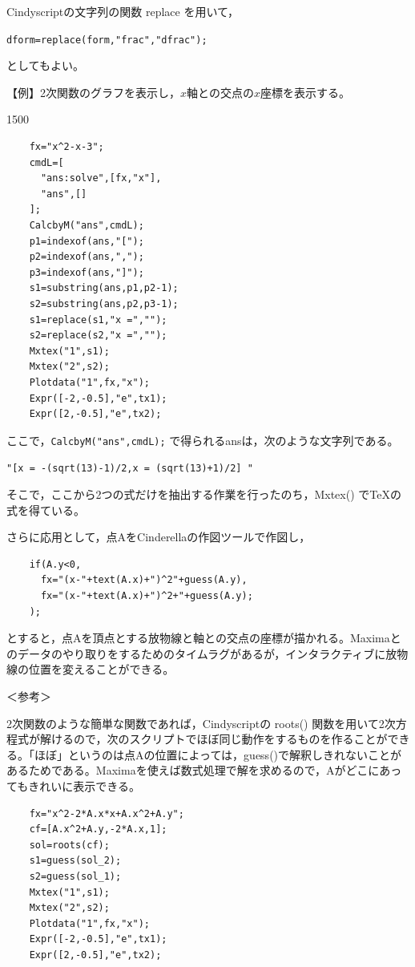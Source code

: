 \documentclass[papersize,a4paper,12pt,uplatex]{jsarticle}
\begin{document}
\begin{description}
Cindyscriptの文字列の関数 replace を用いて，

\hspace{10mm} \verb|dform=replace(form,"frac","dfrac");| 
      
としてもよい。

\vspace{10mm}

\vspace{\baselineskip}
【例】2次関数のグラフを表示し，$x$軸との交点の$x$座標を表示する。

\begin{layer}{150}{0}
\end{layer}
\begin{verbatim}
    fx="x^2-x-3";
    cmdL=[
      "ans:solve",[fx,"x"],
      "ans",[]
    ];
    CalcbyM("ans",cmdL);
    p1=indexof(ans,"[");
    p2=indexof(ans,",");
    p3=indexof(ans,"]");
    s1=substring(ans,p1,p2-1);
    s2=substring(ans,p2,p3-1);
    s1=replace(s1,"x =","");
    s2=replace(s2,"x =","");
    Mxtex("1",s1);
    Mxtex("2",s2);
    Plotdata("1",fx,"x");
    Expr([-2,-0.5],"e",tx1);
    Expr([2,-0.5],"e",tx2);
\end{verbatim}

ここで，\verb|CalcbyM("ans",cmdL);| で得られるansは，次のような文字列である。
  
        \verb|"[x = -(sqrt(13)-1)/2,x = (sqrt(13)+1)/2] "|
        
そこで，ここから2つの式だけを抽出する作業を行ったのち，Mxtex() でTeXの式を得ている。

さらに応用として，点AをCinderellaの作図ツールで作図し，
\begin{verbatim}
    if(A.y<0,
      fx="(x-"+text(A.x)+")^2"+guess(A.y),
      fx="(x-"+text(A.x)+")^2+"+guess(A.y);
    );
\end{verbatim}
とすると，点Aを頂点とする放物線と軸との交点の座標が描かれる。Maximaとのデータのやり取りをするためのタイムラグがあるが，インタラクティブに放物線の位置を変えることができる。

\vspace{\baselineskip}
＜参考＞

  2次関数のような簡単な関数であれば，Cindyscriptの roots() 関数を用いて2次方程式が解けるので，次のスクリプトでほぼ同じ動作をするものを作ることができる。「ほぼ」というのは点Aの位置によっては，guess()で解釈しきれないことがあるためである。Maximaを使えば数式処理で解を求めるので，Aがどこにあってもきれいに表示できる。
\begin{verbatim}
    fx="x^2-2*A.x*x+A.x^2+A.y";
    cf=[A.x^2+A.y,-2*A.x,1];
    sol=roots(cf);
    s1=guess(sol_2);
    s2=guess(sol_1);
    Mxtex("1",s1);
    Mxtex("2",s2);
    Plotdata("1",fx,"x");
    Expr([-2,-0.5],"e",tx1);
    Expr([2,-0.5],"e",tx2);
\end{verbatim}

\end{description}
\end{document}
